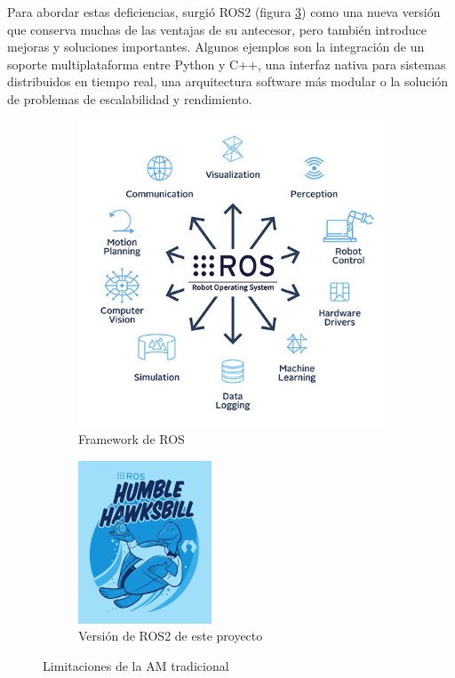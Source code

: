 Para abordar estas deficiencias, surgió ROS2 \cite{ROS2_web}\cite{ROS2_docu_humble} (figura \ref{fig:ros2-humble-small}) como una nueva versión que conserva muchas de las ventajas de su antecesor, pero también introduce mejoras y soluciones importantes. Algunos ejemplos son la integración de un soporte multiplataforma entre Python y C++, una interfaz nativa para sistemas distribuidos en tiempo real, una arquitectura software más modular o la solución de problemas de escalabilidad y rendimiento.
    
\begin{figure}[h!]
    \begin{subfigure}[h!]{0.45\linewidth} 
        \centering
        \includegraphics[scale=0.20]{figuras/ros_aplicaciones.jpg}
        \caption{Framework de \acrshort{ROS}}
        \label{fig:ros_aplicaciones}
    \end{subfigure}
    \begin{subfigure}[h!]{0.45\linewidth} 
        \centering
        \includegraphics[scale=1.6]{figuras/ros2-humble-small.png}
        \caption{Versión de ROS2 de este proyecto \cite{ROS2_docu_humble}}
        \label{fig:ros2-humble-small}
    \end{subfigure}
    \caption{Limitaciones de la \acrshort{AM} tradicional}
\end{figure}

